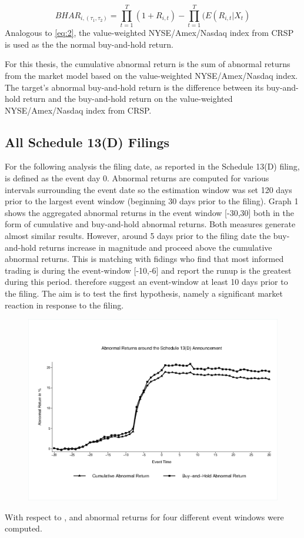 \documentclass[12pt]{article}
\begin{document}
\begin{equation}
	BHAR_{i,(\tau_1,\tau_2)}=\prod_{t=1}^{T}(1+R_{i,t})-\prod_{t=1}^{T}(E(R_{i,t}|X_{t})
\end{equation}
Analogous to \eqref{eq:2}, the value-weighted NYSE/Amex/Nasdaq index from CRSP is used as the the normal buy-and-hold return.

For this thesis, the cumulative abnormal return is the sum of abnormal returns from the market model based on the value-weighted NYSE/Amex/Nasdaq index. The target's abnormal buy-and-hold return is the difference between its buy-and-hold return and the buy-and-hold return on the value-weighted NYSE/Amex/Nasdaq index from CRSP. 

\subsection{All Schedule 13(D) Filings}
For the following analysis the filing date, as reported in the Schedule 13(D) filing, is defined as the event day 0. Abnormal returns are computed for various intervals surrounding the event date so the estimation window was set 120 days prior to the largest event window (beginning 30 days prior to the filing). 
Graph 1 shows the aggregated abnormal returns in the event window [-30,30] both in the form of cumulative and buy-and-hold abnormal returns. Both measures generate almost similar results. However, around 5 days prior to the filing date the buy-and-hold returns increase in magnitude and proceed above the cumulative abnormal returns. This is matching with \citet{Brigida2012} fidings who find that most informed trading is during the event-window [-10,-6] and report the runup is the greatest during this period. \citet{Brigida2012} therefore suggest an event-window at least 10 days prior to the filing.  
The aim is to test the first hypothesis, namely a significant market reaction in response to the filing.
\begin{figure}
	\includegraphics{Abnormal_Returns.eps} \label{AR both}
\end{figure}
With respect to \citet{Brigida2012}, \citet{Klein2009} and \citet{Brav2008} abnormal returns for four different event windows were computed. 
\end{document}
